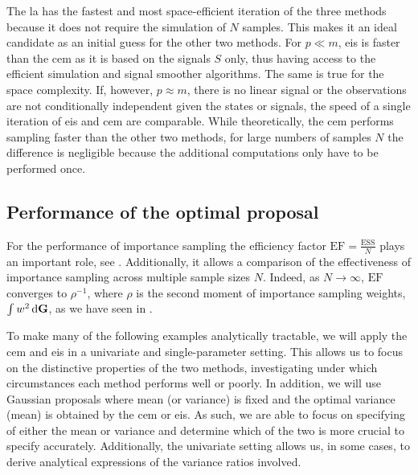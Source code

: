 The \gls{la} has the fastest and most space-efficient iteration of the three methods because it does not require the simulation of $N$ samples. This makes it an ideal candidate as an initial guess for the other two methods. 
For $p \ll m$, \gls{eis} is faster than the \gls{cem} as it is based on the signals $S$ only, thus having access to the efficient simulation and signal smoother algorithms. The same is true for the space complexity. If, however, $p\approx m$, there is no linear signal or the observations are not conditionally independent given the states or signals, the speed of a single iteration of \gls{eis} and \gls{cem} are comparable. 
While theoretically, the \gls{cem} performs sampling faster than the other two methods, for large numbers of samples $N$ the difference is negligible because the additional computations only have to be performed once. 

\subsection{Performance of the optimal proposal}
\label{subsec:performance_at_optimal}
For the performance of importance sampling the efficiency factor $ \text{EF} = \frac{\text{ESS}}{N}$ plays an important role, see . Additionally, it allows a comparison of the effectiveness of importance sampling across multiple sample sizes $N$. Indeed, as $N\to\infty$, $\text{EF}$ converges to $ \rho^{-1}$, where $\rho$ is the second moment of importance sampling weights, $\int w^{2} \,\mathrm d \mathbf G$, as we have seen in .

To make many of the following examples analytically tractable, we will apply the \gls{cem} and \gls{eis} in a univariate and single-parameter setting. This allows us to focus on the distinctive properties of the two methods, investigating under which circumstances each method performs well or poorly. In addition, we will use Gaussian proposals where mean (or variance) is fixed and the optimal variance (mean) is obtained by the \gls{cem} or \gls{eis}.
As such, we are able to focus on specifying of either the mean or variance and determine which of the two is more crucial to specify accurately. Additionally, the univariate setting allows us, in some cases, to derive analytical expressions of the variance ratios involved.

